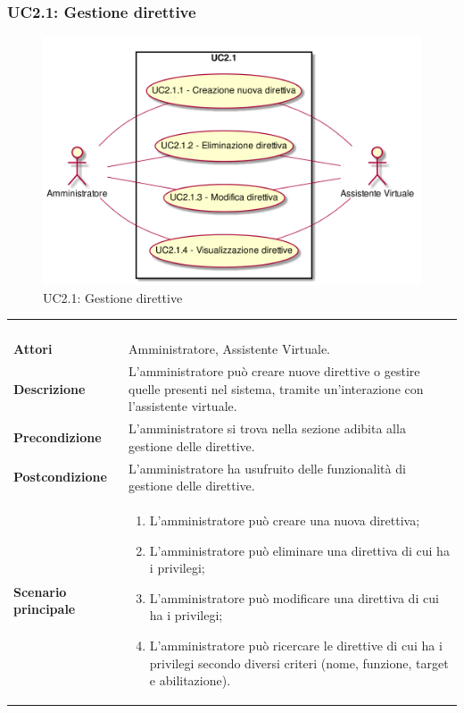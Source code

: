\newpage\subsubsection{UC2.1: Gestione direttive}
\label{UC2.1}
\begin{figure}[h]
\centering
\includegraphics[width=\textwidth,height=\textheight,keepaspectratio]{images/UseCaseUC21.png}
\caption{UC2.1: Gestione direttive}
\end{figure}
\begin{longtable}{l|p{10cm}}
\rowcolor[gray]{0.8} \multicolumn{2}{c}{} \\
\rowcolor[gray]{0.8} \multicolumn{2}{c}{\textbf{UC2.1 - Gestione direttive}} \\
\rowcolor[gray]{0.8} \multicolumn{2}{c}{} \\
\hline
&\\
\textbf{Attori} & Amministratore, Assistente Virtuale.\\[7pt]
\textbf{Descrizione} & L'amministratore può creare nuove direttive o gestire quelle presenti nel sistema, tramite un'interazione con l'assistente virtuale.\\[7pt]
\textbf{Precondizione} & L'amministratore si trova nella sezione adibita alla gestione delle direttive.\\[7pt]
\textbf{Postcondizione} & L'amministratore ha usufruito delle funzionalità di gestione delle direttive.\\[7pt]
\textbf{Scenario principale} &\begin{enumerate}
\item  L'amministratore può creare una nuova direttiva;
\item  L'amministratore può eliminare una direttiva di cui ha i privilegi;
\item  L'amministratore può modificare una direttiva di cui ha i privilegi;
\item  L'amministratore può ricercare le direttive di cui ha i privilegi secondo diversi criteri (nome, funzione, target e abilitazione).
\end{enumerate}
\\[7pt]\hline
\end{longtable}


